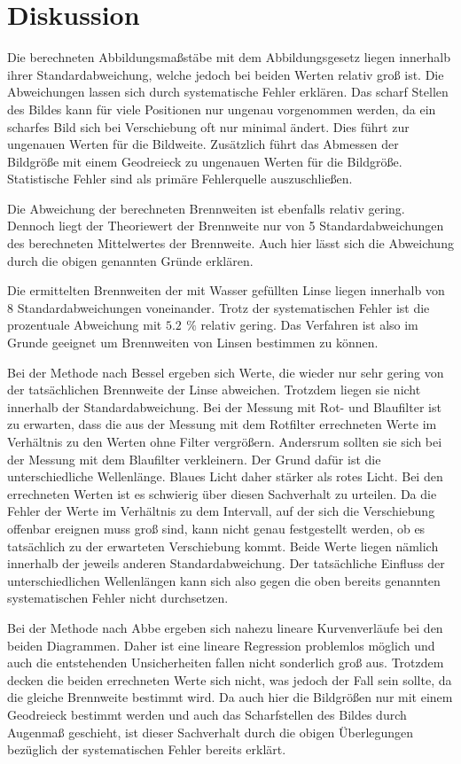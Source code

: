 \section{Diskussion}
\label{sec:Diskussion}
Die berechneten Abbildungsmaßstäbe mit dem Abbildungsgesetz liegen innerhalb ihrer Standardabweichung, welche
jedoch bei beiden Werten relativ groß ist. Die Abweichungen lassen sich durch systematische Fehler erklären.
Das scharf Stellen des Bildes kann für viele Positionen nur ungenau vorgenommen werden, da ein
scharfes Bild sich bei Verschiebung oft nur minimal ändert. Dies führt zur ungenauen Werten für die Bildweite.
Zusätzlich führt das Abmessen der Bildgröße mit einem Geodreieck zu ungenauen Werten für die Bildgröße.
Statistische Fehler sind als primäre Fehlerquelle auszuschließen.

Die Abweichung der berechneten Brennweiten ist ebenfalls relativ gering. Dennoch liegt der
Theoriewert der Brennweite nur von 5 Standardabweichungen des berechneten Mittelwertes der Brennweite. Auch hier lässt
sich die Abweichung durch die obigen genannten Gründe erklären.

Die ermittelten Brennweiten der mit Wasser gefüllten Linse liegen innerhalb von 8 Standardabweichungen voneinander.
Trotz der systematischen Fehler ist die prozentuale Abweichung mit $\SI{5.2}{} \, \%$ relativ gering. %
Das Verfahren ist also im Grunde geeignet um Brennweiten von Linsen bestimmen zu können.


Bei der Methode nach Bessel ergeben sich Werte, die wieder nur sehr gering von der tatsächlichen Brennweite der
Linse abweichen. Trotzdem liegen sie nicht innerhalb der Standardabweichung.
Bei der Messung mit Rot- und Blaufilter ist zu erwarten, dass die aus der Messung mit dem Rotfilter errechneten Werte
im Verhältnis zu den Werten ohne Filter vergrößern. Andersrum sollten sie sich bei der Messung mit dem Blaufilter verkleinern.
Der Grund dafür ist die unterschiedliche Wellenlänge. Blaues Licht daher stärker als rotes Licht. Bei den errechneten Werten
ist es schwierig über diesen Sachverhalt zu urteilen. Da die Fehler der Werte im Verhältnis zu dem Intervall, auf der sich
die Verschiebung offenbar ereignen muss groß sind, kann nicht genau festgestellt werden, ob es tatsächlich zu der erwarteten
Verschiebung kommt. Beide Werte liegen nämlich innerhalb der jeweils anderen Standardabweichung. Der tatsächliche Einfluss der unterschiedlichen Wellenlängen
kann sich also gegen die oben bereits genannten systematischen Fehler nicht durchsetzen.

Bei der Methode nach Abbe ergeben sich nahezu lineare Kurvenverläufe bei den beiden Diagrammen. Daher ist eine
lineare Regression problemlos möglich und auch die entstehenden Unsicherheiten fallen nicht sonderlich groß aus.
Trotzdem decken die beiden errechneten Werte sich nicht, was jedoch der Fall sein sollte, da die gleiche Brennweite
bestimmt wird. Da auch hier die Bildgrößen nur mit einem Geodreieck bestimmt werden und auch das Scharfstellen des Bildes
durch Augenmaß geschieht, ist dieser Sachverhalt durch die obigen Überlegungen bezüglich der systematischen Fehler
bereits erklärt.

